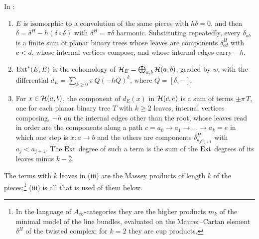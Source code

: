 \begin{lemma}\label{lem:harmonicmodel}
In :
\begin{enumerate}[label=\textup{(\roman*)},leftmargin=2.6em,itemsep=2pt]
\item $E$ is isomorphic to a convolution of the same pieces with
  $h\delta=0$, and then $\delta=\delta^{H}-h(\delta\circ\delta)$ with
  $\delta^{H}=\pi\delta$ harmonic. Substituting repeatedly, every
  $\delta_{ab}$ is a finite sum of planar binary trees whose leaves are
  components $\delta^{H}_{cd}$ with $c<d$, whose internal vertices compose,
  and whose internal edges carry $-h$.
\item $\operatorname{Ext}^{*}(E,E)$ is the cohomology of
  $\mathcal{H}_{E}=\bigoplus_{a,b}\mathcal{H}(a,b)$, graded by $w$, with the differential
  $d_{E}=\sum_{k\ge0}\pi\,Q(-hQ)^{k}$, where $Q=[\delta,-]$.
\item For $x\in\mathcal{H}(a,b)$, the component of $d_{E}(x)$ in $\mathcal{H}(c,e)$ is a sum
  of terms $\pm\pi\,T$, one for each planar binary tree $T$ with $k\ge2$
  leaves, internal vertices composing, $-h$ on the internal edges other
  than the root, whose leaves read in order are the components along a path
  $c=a_{0}\to a_{1}\to\dots\to a_{k}=e$ in which one step is
  $x\colon a\to b$ and the others are components $\delta^{H}_{a_{j}a_{j+1}}$
  with $a_{j}<a_{j+1}$. The $\operatorname{Ext}$ degree of such a term is the sum of the
  $\operatorname{Ext}$ degrees of its leaves minus $k-2$.
\end{enumerate}
\end{lemma}

The terms with $k$ leaves in (iii) are the Massey products of length $k$ of
the pieces;\footnote{In the language of $A_{\infty}$-categories they are the
higher products $m_{k}$ of the minimal model of the line bundles, evaluated
on the Maurer--Cartan element $\delta^{H}$ of the twisted complex; for
$k=2$ they are cup products.} (iii) is all that is used of them below.


